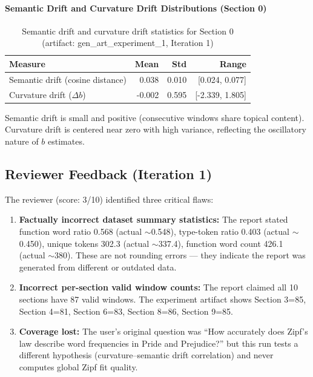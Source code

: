 \documentclass[11pt,letterpaper]{article}
\begin{document}
\paragraph{Semantic Drift and Curvature Drift Distributions (Section 0)}

\begin{table}[!htbp]
\centering
\caption{Semantic drift and curvature drift statistics for Section 0 (artifact: gen\_art\_experiment\_1, Iteration 1)}
\label{tab:drift_stats}
\begin{tabular}{lrrr}
\toprule
Measure & Mean & Std & Range \\
\midrule
Semantic drift (cosine distance) & 0.038 & 0.010 & [0.024, 0.077] \\
Curvature drift ($\Delta b$) & -0.002 & 0.595 & [-2.339, 1.805] \\
\bottomrule
\end{tabular}
\end{table}

Semantic drift is small and positive (consecutive windows share topical content). Curvature drift is centered near zero with high variance, reflecting the oscillatory nature of $b$ estimates.

\subsection{Reviewer Feedback (Iteration 1)}

The reviewer (score: 3/10) identified three critical flaws:
\begin{enumerate}
\item \textbf{Factually incorrect dataset summary statistics:} The report stated function word ratio 0.568 (actual $\sim$0.548), type-token ratio 0.403 (actual $\sim$0.450), unique tokens 302.3 (actual $\sim$337.4), function word count 426.1 (actual $\sim$380). These are not rounding errors — they indicate the report was generated from different or outdated data.
\item \textbf{Incorrect per-section valid window counts:} The report claimed all 10 sections have 87 valid windows. The experiment artifact shows Section 3=85, Section 4=81, Section 6=83, Section 8=86, Section 9=85.
\item \textbf{Coverage lost:} The user's original question was ``How accurately does Zipf's law describe word frequencies in Pride and Prejudice?'' but this run tests a different hypothesis (curvature--semantic drift correlation) and never computes global Zipf fit quality.
\end{enumerate}
\end{document}

